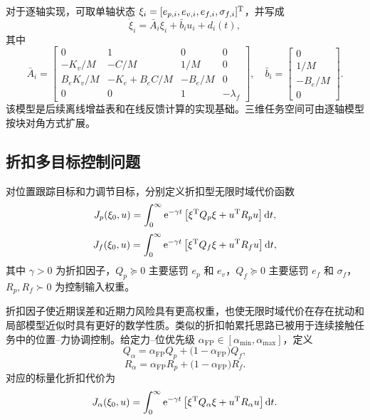 对于逐轴实现，可取单轴状态 $\xi_i=[e_{p,i},e_{v,i},e_{f,i},\sigma_{f,i}]^{\mathrm{T}}$，并写成
\begin{equation}
  \dot\xi_i=\bar A_i\xi_i+\bar b_i u_i+d_i(t),
  \label{eq:ch4_axis_state}
\end{equation}
其中
\begin{equation}
  \bar A_i=\begin{bmatrix}
  0&1&0&0\\
  -K_v/M&-C/M&1/M&0\\
  B_eK_v/M&-K_e+B_eC/M&-B_e/M&0\\
  0&0&1&-\lambda_f
  \end{bmatrix},
  \quad
  \bar b_i=\begin{bmatrix}0\\1/M\\-B_e/M\\0\end{bmatrix} .
  \label{eq:ch4_axis_matrices}
\end{equation}
该模型是后续离线增益表和在线反馈计算的实现基础。三维任务空间可由逐轴模型按块对角方式扩展。

\subsection{折扣多目标控制问题}
\label{subsec:ch4_discount_problem}

\begin{definition}[折扣型位置目标与力目标代价函数]
\label{def:ch4_discount_costs}
对位置跟踪目标和力调节目标，分别定义折扣型无限时域代价函数
\begin{equation}
  J_p(\xi_0,u)=\int_0^\infty \mathrm{e}^{-\gamma t}\left[\xi^{\mathrm{T}}Q_p\xi+u^{\mathrm{T}}R_pu\right]\mathrm{d} t,
  \label{eq:ch4_Jp}
\end{equation}
\begin{equation}
  J_f(\xi_0,u)=\int_0^\infty \mathrm{e}^{-\gamma t}\left[\xi^{\mathrm{T}}Q_f\xi+u^{\mathrm{T}}R_fu\right]\mathrm{d} t,
  \label{eq:ch4_Jf}
\end{equation}
其中 $\gamma>0$ 为折扣因子，$Q_p\succeq0$ 主要惩罚 $e_p$ 和 $e_v$，$Q_f\succeq0$ 主要惩罚 $e_f$ 和 $\sigma_f$，$R_p,R_f\succ0$ 为控制输入权重。
\end{definition}

折扣因子使近期误差和近期力风险具有更高权重，也使无限时域代价在存在扰动和局部模型近似时具有更好的数学性质。类似的折扣帕累托思路已被用于连续接触任务中的位置--力协调控制\cite{li2026pareto}。给定力--位优先级 $\alpha_{\mathrm{FP}}\in[\alpha_{\min},\alpha_{\max}]$，定义
\begin{equation}
  Q_\alpha=\alpha_{\mathrm{FP}}Q_p+\bigl(1-\alpha_{\mathrm{FP}}\bigr)Q_f,
  \label{eq:ch4_Qalpha}
\end{equation}
\begin{equation}
  R_\alpha=\alpha_{\mathrm{FP}}R_p+\bigl(1-\alpha_{\mathrm{FP}}\bigr)R_f .
  \label{eq:ch4_Ralpha}
\end{equation}
对应的标量化折扣代价为
\begin{equation}
  J_\alpha(\xi_0,u)=\int_0^\infty \mathrm{e}^{-\gamma t}\left[\xi^{\mathrm{T}}Q_\alpha\xi+u^{\mathrm{T}}R_\alpha u\right]\mathrm{d} t .
  \label{eq:ch4_Jalpha}
\end{equation}

